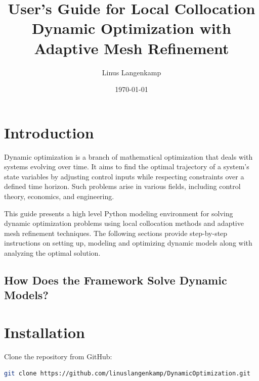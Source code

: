 \documentclass[12pt]{article}
\title{User's Guide for Local Collocation Dynamic Optimization with Adaptive Mesh Refinement}
\author{Linus Langenkamp}
\date{\today}
\begin{document}
	
	\maketitle
	
	\tableofcontents
	\newpage
	
	\section{Introduction}
	
	Dynamic optimization is a branch of mathematical optimization that deals with systems evolving over time. It aims to find the optimal trajectory of a system's state variables by adjusting control inputs while respecting constraints over a defined time horizon. Such problems arise in various fields, including control theory, economics, and engineering.
	
	This guide presents a high level Python modeling environment for solving dynamic optimization problems using local collocation methods and adaptive mesh refinement techniques. The following sections provide step-by-step instructions on setting up, modeling and optimizing dynamic models along with analyzing the optimal solution.
	
	\subsection{How Does the Framework Solve Dynamic Models?}
	
	
	\section{Installation}
	Clone the repository from GitHub:
	
	\begin{lstlisting}[language=bash]
git clone https://github.com/linuslangenkamp/DynamicOptimization.git
	\end{lstlisting}
	
\end{document}
